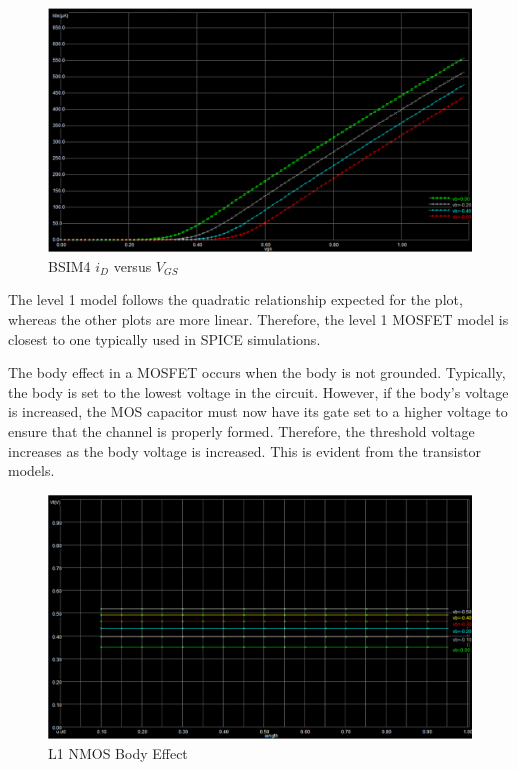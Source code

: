\FloatBarrier

\FloatBarrier

\begin{figure}[h!]
	\centering
	\includegraphics[scale=0.50]{./images/id_vgs_bsim4.PNG}
	\caption{BSIM4 $i_{D}$ versus $V_{GS}$}
	\label{fig:id_vgs_bsim4}
\end{figure}

\FloatBarrier

The level 1 model follows the quadratic relationship expected for the plot, whereas the other plots are more linear.
Therefore, the level 1 MOSFET model is closest to one typically used in SPICE simulations.

The body effect in a MOSFET occurs when the body is not grounded.
Typically, the body is set to the lowest voltage in the circuit.
However, if the body's voltage is increased, the MOS capacitor must now have its gate set to a higher voltage to ensure that the channel is properly formed.
Therefore, the threshold voltage increases as the body voltage is increased.
This is evident from the transistor models.

\FloatBarrier

\begin{figure}[h!]
	\centering
	\includegraphics[scale=0.50]{./images/level1_body_effect_nmos.PNG}
	\caption{L1 NMOS Body Effect}
	\label{fig:l1_bodyeffect}
\end{figure}

